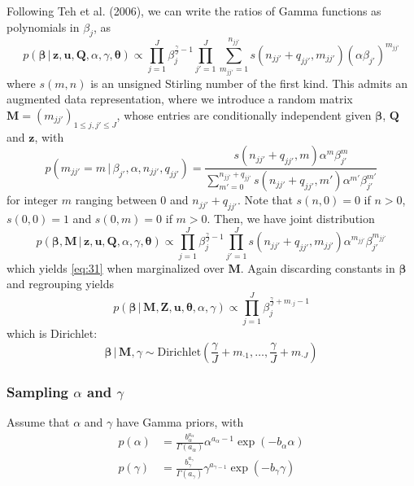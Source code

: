 \documentclass[12pt,letterpaper]{report}
\newcommand{\given}{\, \vert \,}
\newcommand{\bM}{\mathbf{M}}
\newcommand{\bQ}{\mathbf{Q}}
\newcommand{\bz}{\mathbf{z}}
\newcommand{\bZ}{\mathbf{Z}}
\newcommand{\bu}{\mathbf{u}}
\newcommand{\bbeta}{\boldsymbol{\beta}}
\newcommand{\btheta}{\boldsymbol{\theta}}
\begin{document}
Following Teh et al. (2006), we can write the ratios of Gamma functions
as polynomials in $\beta_j$, as
\begin{equation}
  \label{eq:31}
  p(\bbeta \given \bz, \bu, \bQ, \alpha, \gamma, \btheta) \propto \prod_{j=1}^J
  \beta_j^{\frac{\gamma}{J} - 1} \prod_{j'=1}^{J} \sum_{m_{jj'} = 1}^{n_{jj'}}
  s(n_{jj'} + q_{jj'}, m_{jj'}) (\alpha \beta_{j'})^{m_{jj'}}
\end{equation}
where $s(m,n)$ is an unsigned Stirling number of the first kind.
This admits an augmented data representation, where we introduce a
random matrix $\bM = (m_{jj'})_{1 \leq j,j' \leq J}$, whose
entries are conditionally independent given $\bbeta$, $\bQ$ and $\bz$, with
\begin{equation}
  \label{eq:32}
  p(m_{jj'} = m \given \beta_{j'}, \alpha, n_{jj'}, q_{jj'}) =
  \frac{s(n_{jj'} + q_{jj'}, m) \alpha^{m}
    \beta_{j'}^{m}}{\sum_{m'=0}^{n_{jj'} + q_{jj'}} s(n_{jj'} +
  q_{jj'}, m') \alpha^{m'} \beta_{j'}^{m'}}
\end{equation}
for integer $m$ ranging between $0$ and $n_{jj'} + q_{jj'}$.  Note
that $s(n,0) = 0$ if $n > 0$, $s(0,0) = 1$ and $s(0,m) = 0$ if $m > 0$.
Then, we have joint distribution
\begin{equation}
  \label{eq:33}
  p(\bbeta, \bM \given \bz, \bu, \bQ, \alpha, \gamma, \btheta) \propto \prod_{j=1}^J
  \beta_j^{\frac{\gamma}{J} - 1} \prod_{j'=1}^{J} s(n_{jj'} + q_{jj'}, m_{jj'}) \alpha^{m_{jj'}} \beta_{j'}^{m_{jj'}}
\end{equation}
which yields \eqref{eq:31} when marginalized over $\bM$.  Again discarding
constants in $\bbeta$ and regrouping yields
\begin{equation}
  \label{eq:34}
  p(\bbeta \given \bM, \bZ, \bu, \btheta, \alpha, \gamma) \propto \prod_{j=1}^J
  \beta_j^{\frac{\gamma}{J} + m_{\cdot j}- 1}
\end{equation}
which is Dirichlet:
\begin{equation}
  \label{eq:38}
  \bbeta \given \bM, \gamma \sim \mathrm{Dirichlet}(\frac{\gamma}{J} +
  m_{\cdot 1}, \dots, \frac{\gamma}{J} + m_{\cdot J})
\end{equation}

\subsubsection{Sampling $\alpha$ and $\gamma$}
\label{sec:sampling-alpha}
Assume that $\alpha$ and $\gamma$ have Gamma priors, with
\begin{align}
  \label{eq:42}
  p(\alpha) &= \frac{b_{\alpha}^{a_{\alpha}}}{\Gamma(a_{\alpha})}
  \alpha^{a_{\alpha} - 1} \exp(-b_{\alpha}\alpha) \\
  p(\gamma) &= \frac{b_{\gamma}^{a_\gamma}}{\Gamma(a_{\gamma})}
  \gamma^{a_{\gamma - 1}} \exp(-b_{\gamma}\gamma)
\end{align}
\end{document}
